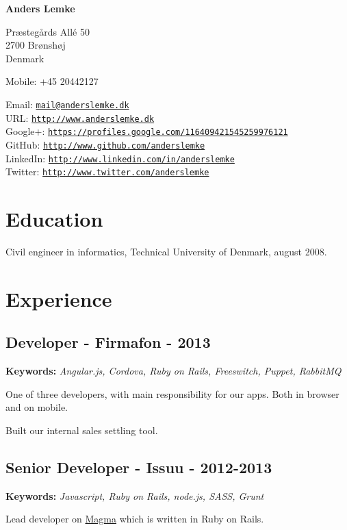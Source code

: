 \documentclass[a4paper]{article}
\newcommand{\keywords}[1]{\small\textbf{Keywords:} \emph{#1}\normalsize}
\begin{document}
{\huge\bf Anders Lemke}

\bigskip
Præstegårds Allé 50 \\
2700 Brønshøj \\
Denmark

\medskip

Mobile: +45 20442127

\medskip

Email: \href{mailto:mail@anderslemke.dk}{\tt mail@anderslemke.dk} \\
URL: \href{http://www.anderslemke.dk}{\tt http://www.anderslemke.dk} \\
Google+: \href{https://profiles.google.com/116409421545259976121}{\tt https://profiles.google.com/116409421545259976121} \\
GitHub: \href{http://www.github.com/anderslemke}{\tt http://www.github.com/anderslemke} \\
LinkedIn: \href{http://www.linkedin.com/in/anderslemke}{\tt http://www.linkedin.com/in/anderslemke} \\
Twitter: \href{http://www.twitter.com/anderslemke}{\tt http://www.twitter.com/anderslemke} 

\section*{Education}
Civil engineer in informatics, Technical University of Denmark, august 2008.

\section*{Experience}

\subsection*{Developer - Firmafon - 2013}
\keywords{Angular.js, Cordova, Ruby on Rails, Freeswitch, Puppet, RabbitMQ}

One of three developers, with main responsibility for our apps. Both in browser and on mobile.

Built our internal sales settling tool.

\subsection*{Senior Developer - Issuu - 2012-2013}
\keywords{Javascript, Ruby on Rails, node.js, SASS, Grunt}

Lead developer on \href{http://www.magmahq.com}{Magma} which is written in Ruby on Rails.
\end{document}
